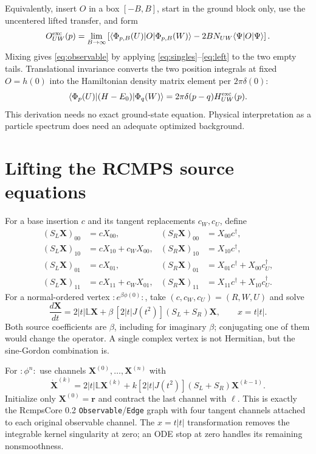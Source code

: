 \documentclass[11pt]{article}
\newcommand{\ket}[1]{\lvert #1\rangle}
\newcommand{\bra}[1]{\langle #1\rvert}
\begin{document}
Equivalently, insert $O$ in a box $[-B,B]$, start in the ground block only,
use the uncentered lifted transfer, and form
\begin{equation}
 O^{\rm exc}_{UW}(p)=\lim_{B\to\infty}
 \left[\bra{\Phi_{p,B}(U)}O\ket{\Phi_{p,B}(W)}
                  -2BN_{UW}\bra\Psi O\ket\Psi\right].
 \label{eq:box}
\end{equation}
Mixing gives \eqref{eq:observable} by applying
\eqref{eq:singles}--\eqref{eq:left} to the two empty tails.
Translational invariance converts the two position integrals at fixed
$O=h(0)$ into the Hamiltonian density matrix element per $2\pi\delta(0)$:
\begin{equation}
 \bra{\Phi_p(U)}(H-E_0)\ket{\Phi_q(W)}
   =2\pi\delta(p-q)H^{\rm exc}_{UW}(p).
\end{equation}
This derivation needs no exact ground-state equation. Physical interpretation
as a particle spectrum does need an adequate optimized background.

\section{Lifting the RCMPS source equations}
For a base insertion $c$ and its tangent replacements $c_W,c_U$, define
\begin{align}
 (S_L\bm X)_{00}&=cX_{00},& (S_R\bm X)_{00}&=X_{00}c^\dagger,\\
 (S_L\bm X)_{10}&=cX_{10}+c_WX_{00},&
 (S_R\bm X)_{10}&=X_{10}c^\dagger,\\
 (S_L\bm X)_{01}&=cX_{01},&
 (S_R\bm X)_{01}&=X_{01}c^\dagger+X_{00}c_U^\dagger,\\
 (S_L\bm X)_{11}&=cX_{11}+c_WX_{01},&
 (S_R\bm X)_{11}&=X_{11}c^\dagger+X_{10}c_U^\dagger.
 \label{eq:sources}
\end{align}
For a normal-ordered vertex $:e^{\beta\phi(0)}:$, take
$(c,c_W,c_U)=(R,W,U)$ and solve
\begin{equation}
 \frac{d\bm X}{dt}=2|t|\mathbb L\bm X+
       \beta\,[2|t|J(t^2)](S_L+S_R)\bm X,
 \qquad x=t|t|.
\end{equation}
Both source coefficients are $\beta$, including for imaginary $\beta$;
conjugating one of them would change the operator. A single complex vertex
is not Hermitian, but the sine-Gordon combination is.

For $:\phi^n:$ use channels $\bm X^{(0)},\ldots,\bm X^{(n)}$ with
\begin{equation}
 \dot{\bm X}^{(k)}=2|t|\mathbb L\bm X^{(k)}
       +k[2|t|J(t^2)](S_L+S_R)\bm X^{(k-1)}.
\end{equation}
Initialize only $\bm X^{(0)}=\bm r$ and contract the last channel with $\ell$.
This is exactly the RcmpsCore 0.2 \texttt{Observable}/\texttt{Edge} graph with
four tangent channels attached to each original observable channel.
The $x=t|t|$ transformation removes the integrable kernel singularity at
zero; an ODE stop at zero handles its remaining nonsmoothness.
\end{document}
